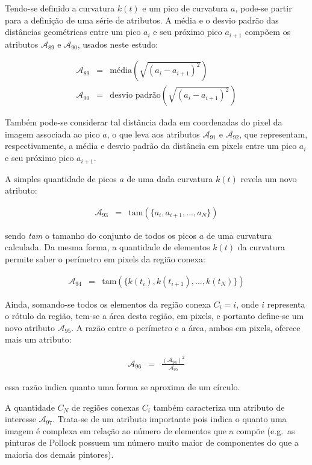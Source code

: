 Tendo-se definido a curvatura $k(t)$ e um pico de curvatura $a$, pode-se partir
para a definição de uma série de atributos. A média e o desvio padrão das
distâncias geométricas entre um pico $a_{i}$ e seu próximo pico $a_{i+1}$
compõem os atributos $\mathcal{A}_{89}$ e $\mathcal{A}_{90}$, usados neste
estudo:

\begin{eqnarray}
  \mathcal{A}_{89} & = & \text{média}(\sqrt{(a_{i} - a_{i+1})^2}) \\
  \mathcal{A}_{90} & = & \text{desvio padrão}(\sqrt{(a_{i} - a_{i+1})^2})
\end{eqnarray}

\noindent Também pode-se considerar tal distância dada em coordenadas do pixel
da imagem associada ao pico $a$, o que leva aos atributos $\mathcal{A}_{91}$ e
$\mathcal{A}_{92}$, que representam, respectivamente, a média e desvio padrão da
distância em pixels entre um pico $a_{i}$ e seu próximo pico $a_{i+1}$.

A simples quantidade de picos $a$ de uma dada curvatura $k(t)$ revela um novo
atributo:

\begin{eqnarray}
  \mathcal{A}_{93} & = & \text{tam}(\{a_{i}, a_{i+1}, ..., a_{N}\})
\end{eqnarray}

\noindent sendo \textit{tam} o tamanho do conjunto de todos os picos $a$ de uma
curvatura calculada. Da mesma forma, a quantidade de elementos $k(t)$ da
curvatura permite saber o perímetro em pixels da região conexa:

\begin{eqnarray}
  \mathcal{A}_{94} & = & \text{tam}(\{k(t_{i}), k(t_{i+1}), ..., k(t_{N})\})
\end{eqnarray}

Ainda, somando-se todos os elementos da região conexa $C_i = i$, onde $i$
representa o rótulo da região, tem-se a área desta região, em pixels, e portanto
define-se um novo atributo $\mathcal{A}_{95}$. A razão entre o perímetro e a
área, ambos em pixels, oferece mais um atributo:

\begin{eqnarray}
  \mathcal{A}_{96} & = & \frac{(\mathcal{A}_{94})^2}{\mathcal{A}_{95}}
\end{eqnarray}

\noindent essa razão indica quanto uma forma se aproxima de um círculo.

A quantidade $C_N$ de regiões conexas $C_i$ também caracteriza um atributo de
interesse $\mathcal{A}_{97}$. Trata-se de um atributo importante pois indica o
quanto uma imagem é complexa em relação ao número de elementos que a compõe
(e.g.\ as pinturas de Pollock possuem um número muito maior de componentes do
que a maioria dos demais pintores).

